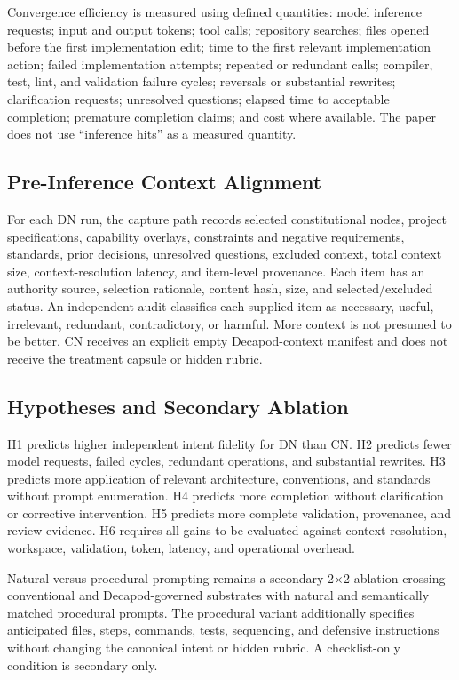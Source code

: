 Convergence efficiency is measured using defined quantities: model inference requests; input and output tokens; tool calls; repository searches; files opened before the first implementation edit; time to the first relevant implementation action; failed implementation attempts; repeated or redundant calls; compiler, test, lint, and validation failure cycles; reversals or substantial rewrites; clarification requests; unresolved questions; elapsed time to acceptable completion; premature completion claims; and cost where available. The paper does not use ``inference hits'' as a measured quantity.

\subsection{Pre-Inference Context Alignment}

For each DN run, the capture path records selected constitutional nodes, project specifications, capability overlays, constraints and negative requirements, standards, prior decisions, unresolved questions, excluded context, total context size, context-resolution latency, and item-level provenance. Each item has an authority source, selection rationale, content hash, size, and selected/excluded status. An independent audit classifies each supplied item as necessary, useful, irrelevant, redundant, contradictory, or harmful. More context is not presumed to be better. CN receives an explicit empty Decapod-context manifest and does not receive the treatment capsule or hidden rubric.

\subsection{Hypotheses and Secondary Ablation}

H1 predicts higher independent intent fidelity for DN than CN. H2 predicts fewer model requests, failed cycles, redundant operations, and substantial rewrites. H3 predicts more application of relevant architecture, conventions, and standards without prompt enumeration. H4 predicts more completion without clarification or corrective intervention. H5 predicts more complete validation, provenance, and review evidence. H6 requires all gains to be evaluated against context-resolution, workspace, validation, token, latency, and operational overhead.

Natural-versus-procedural prompting remains a secondary 2$\times$2 ablation crossing conventional and Decapod-governed substrates with natural and semantically matched procedural prompts. The procedural variant additionally specifies anticipated files, steps, commands, tests, sequencing, and defensive instructions without changing the canonical intent or hidden rubric. A checklist-only condition is secondary only.


